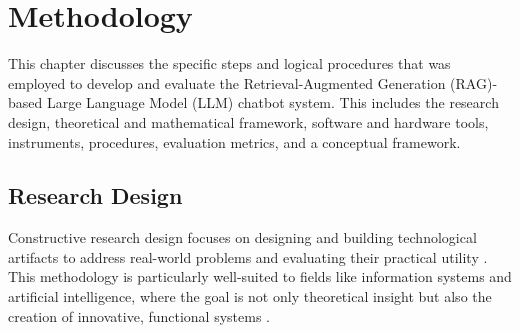 \chapter{Methodology}
\begin{refsection}
 
This chapter discusses the specific steps and logical procedures that was employed to develop and evaluate the Retrieval-Augmented Generation (RAG)-based Large Language Model (LLM) chatbot system. This includes the research design, theoretical and mathematical framework, software and hardware tools, instruments, procedures, evaluation metrics, and a conceptual framework.

\section{Research Design}



Constructive research design focuses on designing and building technological artifacts to address real-world problems and evaluating their practical utility \citeauthor{lukka2003cons} \citeyear{lukka2003cons}. This methodology is particularly well-suited to fields like information systems and artificial intelligence, where the goal is not only theoretical insight but also the creation of innovative, functional systems \cite{lukka2003cons}.


\end{refsection}

